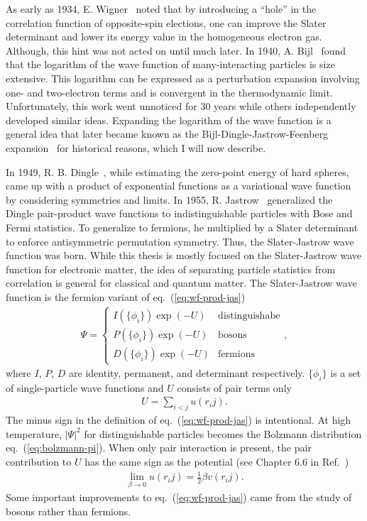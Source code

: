 As early as 1934, E. Wigner~\cite{Wigner1934} noted that by introducing a “hole” in the correlation function of opposite-spin elections, one can improve the Slater determinant and lower its energy value in the homogeneous electron gas. Although, this hint was not acted on until much later.
In 1940, A. Bijl~\cite{Bijl1940} found that the logarithm of the wave function of many-interacting particles is size extensive. This logarithm can be expressed as a perturbation expansion involving one- and two-electron terms and is convergent in the thermodynamic limit.
Unfortunately, this work went unnoticed for 30 years while others independently developed similar ideas. Expanding the logarithm of the wave function is a general idea that later became known as the Bijl-Dingle-Jastrow-Feenberg expansion~\cite{Carleo2017} for historical reasons, which I will now describe.

In 1949, R. B. Dingle~\cite{Dingle1949}, while estimating the zero-point energy of hard spheres, came up with a product of exponential functions as a variational wave function by considering symmetries and limits. In 1955, R. Jastrow~\cite{Jastrow1955} generalized the Dingle pair-product wave functions to indistinguishable particles with Bose and Fermi statistics. To generalize to fermions, he multiplied by a Slater determinant to enforce antisymmetric permutation symmetry. Thus, the Slater-Jastrow wave function was born. While this thesis is mostly focused on the Slater-Jastrow wave function for electronic matter, the idea of separating particle statistics from correlation is general for classical and quantum matter. The Slater-Jastrow wave function is the fermion variant of eq.~(\ref{eq:wf-prod-jas})
\begin{align} \label{eq:wf-prod-jas}
\Psi = \left\{\begin{array}{ll}
I(\{\phi_i\}) \exp(-U) & \text{distinguishabe} \\
P(\{\phi_i\}) \exp(-U) & \text{bosons} \\
D(\{\phi_i\}) \exp(-U) & \text{fermions}
\end{array}\right.,
\end{align}
where $I$, $P$, $D$ are identity, permanent, and determinant respectively.
$\{\phi_i\}$ is a set of single-particle wave functions and $U$ consists of pair terms only
\begin{align} \label{eq:wf-pair-jas}
U = \sum\limits_{i<j} u(r_ij).
\end{align}
The minus sign in the definition of eq.~(\ref{eq:wf-prod-jas}) is intentional.
At high temperature, $\vert\Psi\vert^2$ for distinguishable particles becomes the Bolzmann distribution eq.~(\ref{eq:bolzmann-pi}). When only pair interaction is present, the pair contribution to $U$ has the same sign as the potential (see Chapter 6.6 in Ref.~\cite{Martin2016})
\begin{align}
\lim\limits_{\beta\rightarrow 0} u(r_ij) = \frac{1}{2}\beta v(r_ij).
\end{align}
Some important improvements to eq.~(\ref{eq:wf-prod-jas}) came from the study of bosons rather than fermions.

